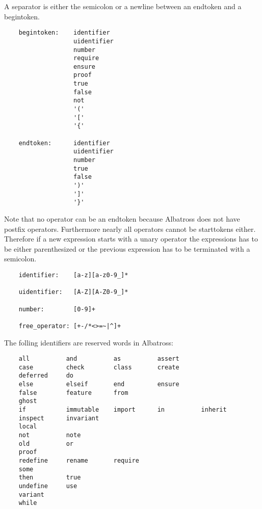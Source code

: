 \newcommand {\semicol}{\lstinline!;!}

A separator is either the semicolon or a newline between an endtoken and a
begintoken.

\begin{lstlisting}
    begintoken:    identifier
                   uidentifier
                   number
                   require
                   ensure
                   proof
                   true
                   false
                   not
                   '('
                   '['
                   '{'

    endtoken:      identifier
                   uidentifier
                   number
                   true
                   false
                   ')'
                   ']'
                   '}'
\end{lstlisting}
Note that no operator can be an endtoken because Albatross does not have
postfix operators. Furthermore nearly all operators cannot be starttokens
either. Therefore if a new expression starts with a unary operator the
expressions has to be either parenthesized or the previous expression has to
be terminated with a semicolon.

\begin{lstlisting}
    identifier:    [a-z][a-z0-9_]*

    uidentifier:   [A-Z][A-Z0-9_]*

    number:        [0-9]+

    free_operator: [+-/*<>=~|^]+
\end{lstlisting}

\noindent The folling identifiers are reserved words in Albatross:
\begin{lstlisting}
    all          and          as          assert
    case         check        class       create
    deferred     do
    else         elseif       end         ensure
    false        feature      from
    ghost
    if           immutable    import      in          inherit
    inspect      invariant
    local
    not          note
    old          or
    proof
    redefine     rename       require
    some
    then         true
    undefine     use
    variant
    while
\end{lstlisting}


